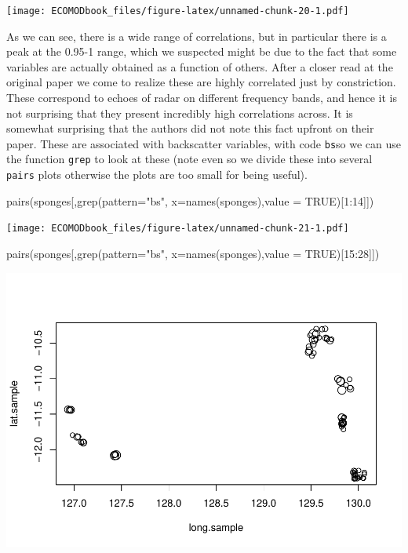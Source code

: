 \documentclass[
]{book}
\newenvironment{Shaded}{\begin{snugshade}}{\end{snugshade}}
\newcommand{\AttributeTok}[1]{\textcolor[rgb]{0.77,0.63,0.00}{#1}}
\newcommand{\ConstantTok}[1]{\textcolor[rgb]{0.00,0.00,0.00}{#1}}
\newcommand{\DecValTok}[1]{\textcolor[rgb]{0.00,0.00,0.81}{#1}}
\newcommand{\FunctionTok}[1]{\textcolor[rgb]{0.00,0.00,0.00}{#1}}
\newcommand{\NormalTok}[1]{#1}
\newcommand{\SpecialCharTok}[1]{\textcolor[rgb]{0.00,0.00,0.00}{#1}}
\newcommand{\StringTok}[1]{\textcolor[rgb]{0.31,0.60,0.02}{#1}}
\begin{document}
\texttt{[image: ECOMODbook\_files/figure-latex/unnamed-chunk-20-1.pdf]}

As we can see, there is a wide range of correlations, but in particular there is a peak at the 0.95-1 range, which we suspected might be due to the fact that some variables are actually obtained as a function of others. After a closer read at the original paper we come to realize these are highly correlated just by constriction. These correspond to echoes of radar on different frequency bands, and hence it is not surprising that they present incredibly high correlations across. It is somewhat surprising that the authors did not note this fact upfront on their paper. These are associated with backscatter variables, with code \texttt{bs}so we can use the function \texttt{grep} to look at these (note even so we divide these into several \texttt{pairs} plots otherwise the plots are too small for being useful).

\begin{Shaded}
\begin{Highlighting}[]
\FunctionTok{pairs}\NormalTok{(sponges[,}\FunctionTok{grep}\NormalTok{(}\AttributeTok{pattern=}\StringTok{"bs"}\NormalTok{, }\AttributeTok{x=}\FunctionTok{names}\NormalTok{(sponges),}\AttributeTok{value =} \ConstantTok{TRUE}\NormalTok{)[}\DecValTok{1}\SpecialCharTok{:}\DecValTok{14}\NormalTok{]])}
\end{Highlighting}
\end{Shaded}

\texttt{[image: ECOMODbook\_files/figure-latex/unnamed-chunk-21-1.pdf]}

\begin{Shaded}
\begin{Highlighting}[]
\FunctionTok{pairs}\NormalTok{(sponges[,}\FunctionTok{grep}\NormalTok{(}\AttributeTok{pattern=}\StringTok{"bs"}\NormalTok{, }\AttributeTok{x=}\FunctionTok{names}\NormalTok{(sponges),}\AttributeTok{value =} \ConstantTok{TRUE}\NormalTok{)[}\DecValTok{15}\SpecialCharTok{:}\DecValTok{28}\NormalTok{]])}
\end{Highlighting}
\end{Shaded}

\includegraphics{ECOMODbook_files/figure-latex/unnamed-chunk-21-2.pdf}
\end{document}
